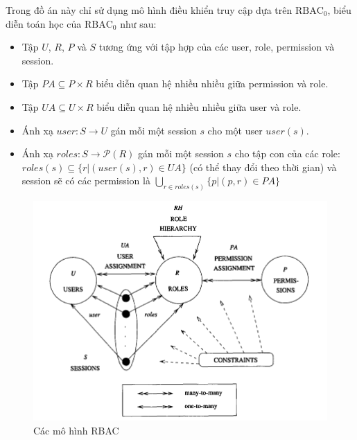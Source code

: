 Trong đồ án này chỉ sử dụng mô hình điều khiển truy cập
dựa trên $\text{RBAC}_0$, biểu diễn toán học của $\text{RBAC}_0$ như sau:
\begin{itemize}[topsep=0ex]
\item Tập $U$, $R$, $P$ và $S$ tương ứng với tập hợp của các
    user, role, permission và session.
\item Tập $PA \subseteq P \times R$ biểu diễn quan hệ nhiều nhiều
    giữa permission và role.
\item Tập $UA \subseteq U \times R$ biểu diễn quan hệ nhiều nhiều giữa user và role.
\item Ánh xạ $user: S \rightarrow U$ gán mỗi một
    session $s$ cho một user $user(s)$.
\item Ánh xạ $roles: S \rightarrow \mathcal{P}(R)$ gán mỗi một
    session $s$ cho tập con của các role: 
    $roles(s) \subseteq \{ r | \left( user(s), r \right) \in UA \}$
    (có thể thay đổi theo thời gian) và session sẽ có các permission
    là $\bigcup_{r \in roles(s)}  \{ p | (p, r) \in PA \}$
\end{itemize}

\begin{figure}[H]
\centering
\includegraphics[width=12cm]{images/RBAC.png}
\caption{Các mô hình RBAC}
\end{figure}








